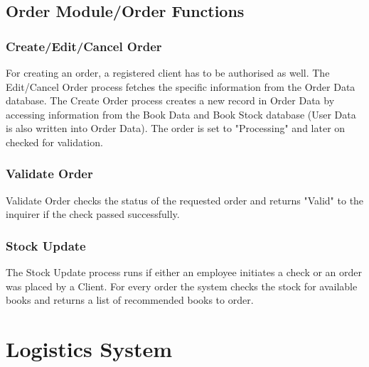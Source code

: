 \documentclass[11pt,a4paper,oneside,svgnames]{report}
\begin{document}
\subsection{Order Module/Order Functions}

\subsubsection{Create/Edit/Cancel Order}

For creating an order, a registered client has to be authorised as well. The Edit/Cancel Order process fetches the specific information from the Order Data database. The Create Order process creates a new record in Order Data by accessing information from the Book Data and Book Stock database (User Data is also written into Order Data). The order is set to "Processing" and later on checked for validation.

\subsubsection{Validate Order}

Validate Order checks the status of the requested order and returns "Valid" to the inquirer if the check passed successfully.

\subsubsection{Stock Update}

The Stock Update process runs if either an employee initiates a check or an order was placed by a Client. For every order the system checks the stock for available books and returns a list of recommended books to order.

\section{Logistics System}
\end{document}
